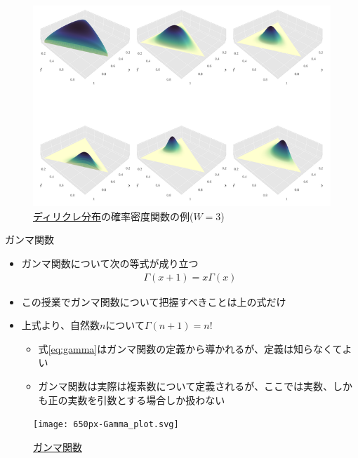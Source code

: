 \documentclass[aspectratio=169,unicode,dvipdfmx,14pt]{beamer}
\begin{document}
\begin{frame}
\begin{figure}[htbp]
\begin{center}
\includegraphics[scale=0.42]{Dirichlet-3d-panel}
\caption{\href{https://en.wikipedia.org/wiki/Dirichlet_distribution}{ディリクレ分布}の確率密度関数の例($W=3$)}
\label{}
\end{center}
\end{figure}
\end{frame}


\begin{frame}{ガンマ関数}
\begin{itemize}
\item ガンマ関数について次の等式が成り立つ
\begin{align}
\Gamma(x+1)=x\Gamma(x) 
\label{eq:gamma}
\end{align}
\item この授業でガンマ関数について把握すべきことは上の式だけ
\item 上式より、自然数$n$について$\Gamma(n+1)=n!$
\begin{itemize}
\item 式\eqref{eq:gamma}はガンマ関数の定義から導かれるが、定義は知らなくてよい
\item ガンマ関数は実際は複素数について定義されるが、ここでは実数、しかも正の実数を引数とする場合しか扱わない
\end{itemize}
\end{itemize}
\end{frame}

\begin{frame}
\begin{figure}[htbp]
\begin{center}
\texttt{[image: 650px-Gamma\_plot.svg]}
\caption{\href{https://en.wikipedia.org/wiki/Gamma_function}{ガンマ関数}}
\label{}
\end{center}
\end{figure}
\end{frame}
\end{document}
